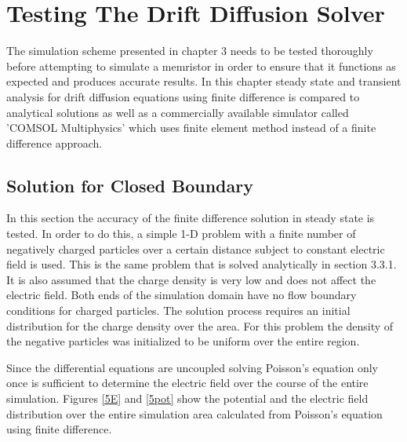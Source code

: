 
\chapter{Testing The Drift Diffusion Solver} %

\label{Chapter5} %


\begin{doublespace}

 The simulation scheme presented in chapter 3 needs to be tested thoroughly before attempting to simulate a memristor in order to ensure that it functions as expected and produces accurate results. In this chapter steady state and transient analysis for drift diffusion equations using finite difference is compared to analytical solutions as well as a commercially available simulator called 'COMSOL Multiphysics' which uses finite element method instead of a finite difference approach.

\section{Solution for Closed Boundary}
In this section the accuracy of the finite difference solution in steady state is tested. In order to do this, a simple 1-D problem with a finite number of negatively charged particles over a certain distance subject to constant electric field is used. This is the same problem that is solved analytically in section 3.3.1. It is also assumed that the charge density is very low and does not affect the electric field. Both ends of the simulation domain have no flow boundary conditions for charged particles. The solution process requires an initial distribution for the charge density over the area. For this problem the density of the negative particles was initialized to be uniform over the entire region. 

Since the differential equations are uncoupled solving Poisson's equation only once is sufficient to determine the electric field over the course of the entire simulation. Figures \ref{5E} and \ref{5pot} show the potential and the electric field distribution over the entire simulation area calculated from Poisson's equation using finite difference. 


\end{doublespace}
